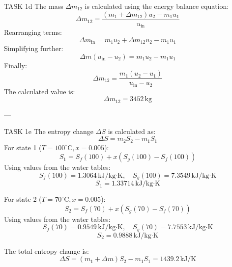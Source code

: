 TASK 1d  
The mass \( \Delta m_{12} \) is calculated using the energy balance equation:  
\[
\Delta m_{12} = \frac{(m_1 + \Delta m_{12}) u_2 - m_1 u_1}{u_{\text{in}}}
\]  
Rearranging terms:  
\[
\Delta m_{\text{in}} = m_1 u_2 + \Delta m_{12} u_2 - m_1 u_1
\]  
Simplifying further:  
\[
\Delta m (u_{\text{in}} - u_2) = m_1 u_2 - m_1 u_1
\]  
Finally:  
\[
\Delta m_{12} = \frac{m_1 (u_2 - u_1)}{u_{\text{in}} - u_2}
\]  
The calculated value is:  
\[
\Delta m_{12} = 3452 \, \text{kg}
\]  

---

TASK 1e  
The entropy change \( \Delta S \) is calculated as:  
\[
\Delta S = m_2 S_2 - m_1 S_1
\]  
For state 1 (\( T = 100^\circ\text{C}, x = 0.005 \)):  
\[
S_1 = S_f(100) + x(S_g(100) - S_f(100))
\]  
Using values from the water tables:  
\[
S_f(100) = 1.3064 \, \text{kJ/kg·K}, \quad S_g(100) = 7.3549 \, \text{kJ/kg·K}
\]  
\[
S_1 = 1.33714 \, \text{kJ/kg·K}
\]  

For state 2 (\( T = 70^\circ\text{C}, x = 0.005 \)):  
\[
S_2 = S_f(70) + x(S_g(70) - S_f(70))
\]  
Using values from the water tables:  
\[
S_f(70) = 0.9549 \, \text{kJ/kg·K}, \quad S_g(70) = 7.7553 \, \text{kJ/kg·K}
\]  
\[
S_2 = 0.9888 \, \text{kJ/kg·K}
\]  

The total entropy change is:  
\[
\Delta S = (m_1 + \Delta m) S_2 - m_1 S_1 = 1439.2 \, \text{kJ/K}
\]  

